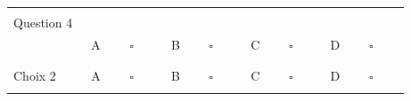 \documentclass{book}%
\begin{document}
\begin{center}
\begin{tabular}{| l l l l l |}
\hline%
 & & & & \\%
Question 4\qquad \qquad\ & & & & \\%
 & A $\qquad \square \qquad$ & B $\qquad \square \qquad$ & C $\qquad \square \qquad$ & D $\qquad \square \qquad$ \\ %
 & & & &  \\%
\hline%
 & & & &  \\%
Choix 2 & A $\qquad \square \qquad$ & B $\qquad \square \qquad$ & C $\qquad \square \qquad$ & D $\qquad \square \qquad$ \\ %
 & & & &  \\%
\hline%
\end{tabular}%
\\ \vskip3mm%
\thispagestyle{empty}%
\end{center}%
\end{document}

